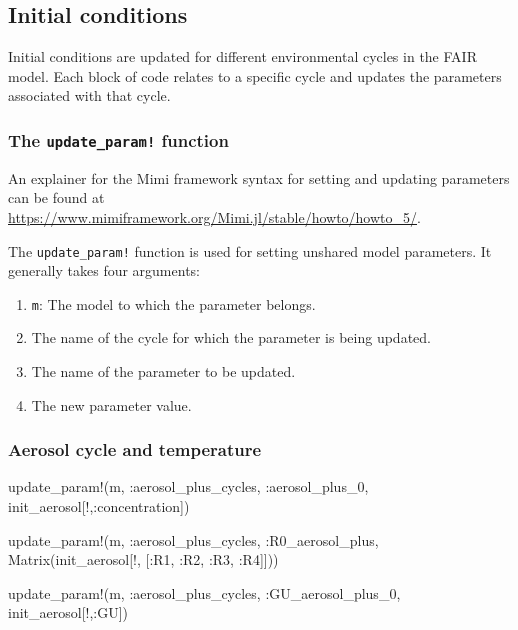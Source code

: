 \documentclass[
]{article}
\newenvironment{Shaded}{}{}
\newcommand{\FunctionTok}[1]{\textcolor[rgb]{0.02,0.16,0.49}{#1}}
\newcommand{\NormalTok}[1]{#1}
\newcommand{\OperatorTok}[1]{\textcolor[rgb]{0.40,0.40,0.40}{#1}}
\providecommand{\tightlist}{%
  \setlength{\itemsep}{0pt}\setlength{\parskip}{0pt}}
\begin{document}
\subsection{Initial conditions}\label{initial-conditions}
Initial conditions are updated for different
environmental cycles in the FAIR model. Each block of code relates to a
specific cycle and updates the parameters associated with that cycle.

\subsubsection{\texorpdfstring{The \texttt{update\_param!}
function}{The update\_param! function}}\label{the-update_param-function}

An explainer for the Mimi framework syntax for setting and updating parameters can be found at \url{https://www.mimiframework.org/Mimi.jl/stable/howto/howto_5/}.

The \texttt{update\_param!} function is used for setting unshared model parameters.
It generally takes four arguments:

\begin{enumerate}
\def\labelenumi{\arabic{enumi}.}
\tightlist
\item
  \texttt{m}: The model to which the parameter belongs.
\item
  The name of the cycle for which the parameter is being updated.
\item
  The name of the parameter to be updated.
\item
  The new parameter value.
\end{enumerate}

\subsubsection{Aerosol cycle and
temperature}\label{aerosol-cycle-and-temperature}

\begin{Shaded}
\begin{Highlighting}[]
\FunctionTok{update\_param!}\NormalTok{(m, }\OperatorTok{:}\NormalTok{aerosol\_plus\_cycles, }\OperatorTok{:}\NormalTok{aerosol\_plus\_0, init\_aerosol[!,}\OperatorTok{:}\NormalTok{concentration])}

\FunctionTok{update\_param!}\NormalTok{(m, }\OperatorTok{:}\NormalTok{aerosol\_plus\_cycles, }\OperatorTok{:}\NormalTok{R0\_aerosol\_plus, } \\
\FunctionTok{                     Matrix}\NormalTok{(init\_aerosol[!, [}\OperatorTok{:}\NormalTok{R1, }\OperatorTok{:}\NormalTok{R2, }\OperatorTok{:}\NormalTok{R3, }\OperatorTok{:}\NormalTok{R4]]))}

\FunctionTok{update\_param!}\NormalTok{(m, }\OperatorTok{:}\NormalTok{aerosol\_plus\_cycles, }\OperatorTok{:}\NormalTok{GU\_aerosol\_plus\_0, init\_aerosol[!,}\OperatorTok{:}\NormalTok{GU])}
\end{Highlighting}
\end{Shaded}
\end{document}
